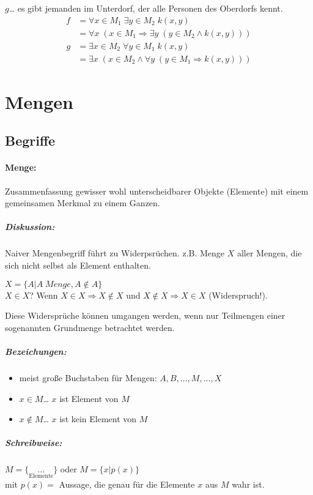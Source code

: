 \begin{enumerate} [label=\alph*)]
$g$… es gibt jemanden im Unterdorf, der alle Personen des Oberdorfs kennt.
\begin{align*}f&=\forall x \in M_1 \; \exists y \in M_2 \; k(x,y)\\
&=\forall x \; (x \in M_1 \Rightarrow \exists y \; (y \in M_2 \wedge k(x,y)))\end{align*}
\begin{align*}
g&= \exists x \in M_2 \; \forall y \in M_1 \; k(x,y)\\
&= \exists x \; (x\in M_2 \wedge \forall y \; (y \in M_1 \Rightarrow k(x,y)))
\end{align*}
\end{enumerate}

\section{Mengen}\label{sec:Mengen}

\subsection{Begriffe}

\paragraph{Menge:} Zusammenfassung gewisser wohl unterscheidbarer Objekte (Elemente) mit einem gemeinsamen Merkmal zu einem Ganzen.

\subparagraph{Diskussion:} Naiver Mengenbegriff führt zu Widerpsrüchen. z.B. Menge $X$ aller Mengen, die sich nicht selbst als Element enthalten.

$X=\{A | A \; Menge, A\not\in A\}$\\
$X\in X$? Wenn $X\in X \Rightarrow X\not\in X$ und $X\not\in X\Rightarrow X \in X$ (Widerspruch!).

Diese Widersprüche können umgangen werden, wenn nur Teilmengen einer sogenannten Grundmenge betrachtet werden.

\subparagraph{Bezeichungen:}
\begin{itemize}
\item meist große Buchstaben für Mengen: $A, B, ..., M, ...,X$
\item $\boxed{x\in M}$… $x$ ist Element von $M$
\item $\boxed{x\not\in M}$… $x$ ist kein Element von $M$
\end{itemize}

\subparagraph{Schreibweise:} \parskp
$M=\{\underset{\text{Elemente}}{...}\}$ oder $M = \{ x | p(x)\}$\\
mit $p(x)=$ Aussage, die genau für die Elemente $x$ aus $M$ wahr ist.

